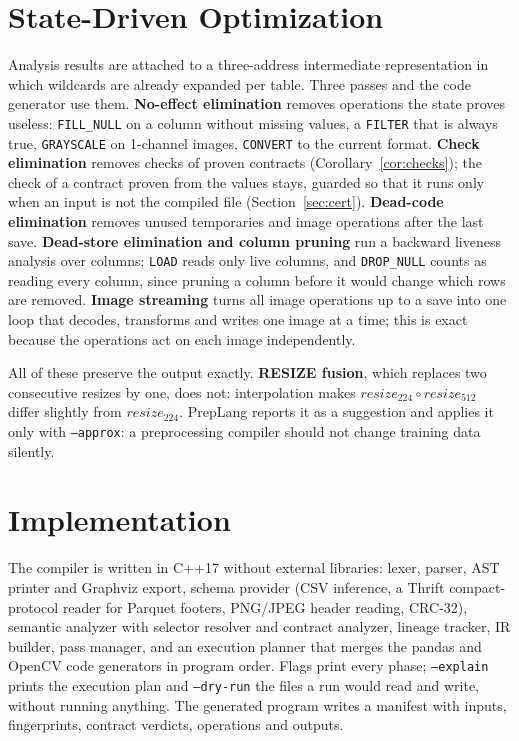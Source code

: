 \documentclass[conference]{IEEEtran}
\begin{document}
\section{State-Driven Optimization}\label{sec:opt}

Analysis results are attached to a three-address intermediate representation in which wildcards
are already expanded per table. Three passes and the code generator use them.
\textbf{No-effect elimination} removes operations the state proves useless: \texttt{FILL\_NULL} on
a column without missing values, a \texttt{FILTER} that is always true, \texttt{GRAYSCALE} on
1-channel images, \texttt{CONVERT} to the current format.
\textbf{Check elimination} removes checks of proven contracts (Corollary~\ref{cor:checks}); the
check of a contract proven from the values stays, guarded so that it runs only when an input is not
the compiled file (Section~\ref{sec:cert}).
\textbf{Dead-code elimination} removes unused temporaries and image operations after the last save.
\textbf{Dead-store elimination and column pruning} run a backward liveness analysis over columns;
\texttt{LOAD} reads only live columns, and \texttt{DROP\_NULL} counts as reading every column,
since pruning a column before it would change which rows are removed.
\textbf{Image streaming} turns all image operations up to a save into one loop that decodes,
transforms and writes one image at a time; this is exact because the operations act on each image
independently.

All of these preserve the output exactly. \textbf{RESIZE fusion}, which replaces two consecutive
resizes by one, does not: interpolation makes $\mathit{resize}_{224} \circ \mathit{resize}_{512}$
differ slightly from $\mathit{resize}_{224}$. PrepLang reports it as a suggestion and applies it
only with \texttt{--approx}: a preprocessing compiler should not change training data silently.

\section{Implementation}

The compiler is written in C++17 without external libraries: lexer, parser, AST printer and
Graphviz export, schema provider (CSV inference, a Thrift compact-protocol reader for Parquet
footers, PNG/JPEG header reading, CRC-32), semantic analyzer with selector resolver and contract
analyzer, lineage tracker, IR builder, pass manager, and an execution planner that merges the
pandas and OpenCV code generators in program order. Flags print every phase; \texttt{--explain}
prints the execution plan and \texttt{--dry-run} the files a run would read and write, without
running anything. The generated program writes a manifest with inputs, fingerprints, contract
verdicts, operations and outputs.
\end{document}
